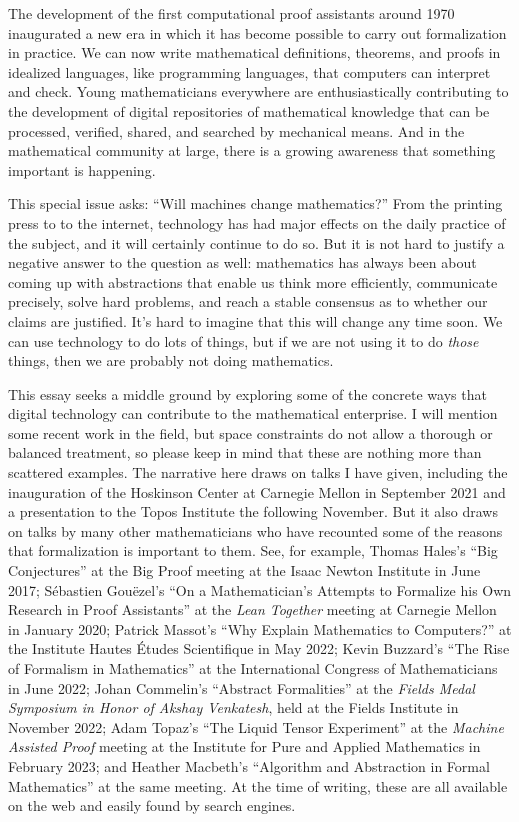 \documentclass[12pt]{amsart}
\theoremstyle{definition}
\theoremstyle{remark}
\numberwithin{equation}{section}
\begin{document}
The development of the first computational proof assistants around 1970 inaugurated a new era in which it has become possible to carry out formalization in practice. We can now write mathematical definitions, theorems, and proofs in idealized languages, like programming languages, that computers can interpret and check. Young mathematicians everywhere are enthusiastically contributing to the development of digital repositories of mathematical knowledge that can be processed, verified, shared, and searched by mechanical means. And in the mathematical community at large, there is a growing awareness that something important is happening.

This special issue asks: ``Will machines change mathematics?'' From the printing press to to the internet, technology has had major effects on the daily practice of the subject, and it will certainly continue to do so. But it is not hard to justify a negative answer to the question as well: mathematics has always been about coming up with abstractions that enable us think more efficiently, communicate precisely, solve hard problems, and reach a stable consensus as to whether our claims are justified. It's hard to imagine that this will change any time soon. We can use technology to do lots of things, but if we are not using it to do \emph{those} things, then we are probably not doing mathematics.

This essay seeks a middle ground by exploring some of the concrete ways that digital technology can contribute to the mathematical enterprise. I will mention some recent work in the field, but space constraints do not allow a thorough or balanced treatment, so please keep in mind that these are nothing more than scattered examples. The narrative here draws on talks I have given, including the inauguration of the Hoskinson Center at Carnegie Mellon in September 2021 and a presentation to the Topos Institute the following November. But it also draws on talks by many other mathematicians who have recounted some of the reasons that formalization is important to them. See, for example, Thomas Hales's ``Big Conjectures'' at the Big Proof meeting at the Isaac Newton Institute in June 2017; S\'ebastien Gou\"ezel's ``On a Mathematician's Attempts to Formalize his Own Research in Proof Assistants'' at the \emph{Lean Together} meeting at Carnegie Mellon in January 2020; Patrick Massot's ``Why Explain Mathematics to Computers?'' at the Institute Hautes \'Etudes Scientifique in May 2022; Kevin Buzzard's ``The Rise of Formalism in Mathematics'' at the International Congress of Mathematicians in June 2022; Johan Commelin's ``Abstract Formalities'' at the \emph{Fields Medal Symposium in Honor of Akshay Venkatesh}, held at the Fields Institute in November 2022; Adam Topaz's ``The Liquid Tensor Experiment'' at the \emph{Machine Assisted Proof} meeting at the Institute for Pure and Applied Mathematics in February 2023; and Heather Macbeth's ``Algorithm and Abstraction in Formal Mathematics'' at the same meeting. At the time of writing, these are all available on the web and easily found by search engines.
\end{document}
